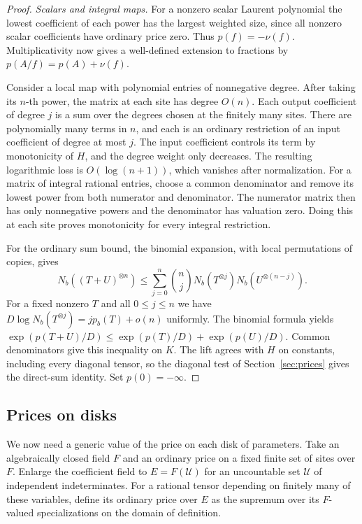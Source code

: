 \begin{proof}
\smallskip\noindent\emph{Scalars and integral maps.}
For a nonzero scalar Laurent polynomial the lowest coefficient of
each power has the largest weighted size, since all nonzero scalar
coefficients have ordinary price zero. Thus $p(f)=-\nu(f)$.
Multiplicativity now gives a well-defined extension to fractions by
$p(A/f)=p(A)+\nu(f)$.

Consider a local map with polynomial entries of nonnegative degree.
After taking its $n$-th power, the matrix at each site has degree
$O(n)$. Each output coefficient of degree $j$ is a sum over the
degrees chosen at the finitely many sites. There are polynomially
many terms in $n$, and each is an ordinary restriction of an input
coefficient of degree at most $j$. The input coefficient controls
its term by monotonicity of $H$, and the degree weight only decreases.
The resulting logarithmic loss is $O(\log(n+1))$, which vanishes
after normalization. For a matrix of integral rational entries,
choose a common denominator and remove its lowest power from both
numerator and denominator. The numerator matrix then has only
nonnegative powers and the denominator has valuation zero. Doing
this at each site proves monotonicity for every integral restriction.

For the ordinary sum bound, the binomial expansion, with local
permutations of copies, gives
\[
 N_b((T+U)^{\otimes n})\le\sum_{j=0}^n\binom nj
        N_b(T^{\otimes j})N_b(U^{\otimes(n-j)}).
\]
For a fixed nonzero $T$ and all $0\le j\le n$ we have
$D\log N_b(T^{\otimes j})=jp_b(T)+o(n)$ uniformly. The binomial
formula yields $\exp(p(T+U)/D)\le\exp(p(T)/D)+\exp(p(U)/D)$.
Common denominators give this inequality on $K$. The lift agrees with
$H$ on constants, including every diagonal tensor, so the diagonal test of Section~\ref{sec:prices} gives
the direct-sum identity. Set $p(0)=-\infty$.
\end{proof}

\subsection{Prices on disks}

We now need a generic value of the price on each disk of parameters.
Take an algebraically closed field $F$ and an ordinary price on a fixed
finite set of sites over $F$. Enlarge the coefficient field to
$E=F(\mathcal U)$ for an uncountable set $\mathcal U$ of independent
indeterminates. For a rational tensor depending on finitely many of
these variables, define its ordinary price over $E$ as the supremum
over its $F$-valued specializations on the domain of definition.

